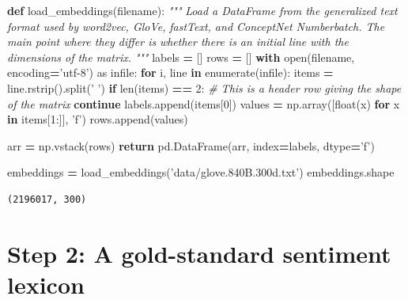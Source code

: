\documentclass[]{book}
\newenvironment{Shaded}{\begin{snugshade}}{\end{snugshade}}
\newcommand{\KeywordTok}[1]{\textcolor[rgb]{0.13,0.29,0.53}{\textbf{#1}}}
\newcommand{\DecValTok}[1]{\textcolor[rgb]{0.00,0.00,0.81}{#1}}
\newcommand{\StringTok}[1]{\textcolor[rgb]{0.31,0.60,0.02}{#1}}
\newcommand{\ImportTok}[1]{#1}
\newcommand{\CommentTok}[1]{\textcolor[rgb]{0.56,0.35,0.01}{\textit{#1}}}
\newcommand{\ControlFlowTok}[1]{\textcolor[rgb]{0.13,0.29,0.53}{\textbf{#1}}}
\newcommand{\OperatorTok}[1]{\textcolor[rgb]{0.81,0.36,0.00}{\textbf{#1}}}
\newcommand{\BuiltInTok}[1]{#1}
\newcommand{\NormalTok}[1]{#1}
\theoremstyle{definition}
\theoremstyle{definition}
\theoremstyle{definition}
\theoremstyle{remark}
\begin{document}
\begin{Shaded}
\begin{Highlighting}[]
\KeywordTok{def}\NormalTok{ load_embeddings(filename):}
    \CommentTok{"""}
\CommentTok{    Load a DataFrame from the generalized text format used by word2vec, GloVe,}
\CommentTok{    fastText, and ConceptNet Numberbatch. The main point where they differ is}
\CommentTok{    whether there is an initial line with the dimensions of the matrix.}
\CommentTok{    """}
\NormalTok{    labels }\OperatorTok{=}\NormalTok{ []}
\NormalTok{    rows }\OperatorTok{=}\NormalTok{ []}
    \ControlFlowTok{with} \BuiltInTok{open}\NormalTok{(filename, encoding}\OperatorTok{=}\StringTok{'utf-8'}\NormalTok{) }\ImportTok{as}\NormalTok{ infile:}
        \ControlFlowTok{for}\NormalTok{ i, line }\KeywordTok{in} \BuiltInTok{enumerate}\NormalTok{(infile):}
\NormalTok{            items }\OperatorTok{=}\NormalTok{ line.rstrip().split(}\StringTok{' '}\NormalTok{)}
            \ControlFlowTok{if} \BuiltInTok{len}\NormalTok{(items) }\OperatorTok{==} \DecValTok{2}\NormalTok{:}
                \CommentTok{# This is a header row giving the shape of the matrix}
                \ControlFlowTok{continue}
\NormalTok{            labels.append(items[}\DecValTok{0}\NormalTok{])}
\NormalTok{            values }\OperatorTok{=}\NormalTok{ np.array([}\BuiltInTok{float}\NormalTok{(x) }\ControlFlowTok{for}\NormalTok{ x }\KeywordTok{in}\NormalTok{ items[}\DecValTok{1}\NormalTok{:]], }\StringTok{'f'}\NormalTok{)}
\NormalTok{            rows.append(values)}
    
\NormalTok{    arr }\OperatorTok{=}\NormalTok{ np.vstack(rows)}
    \ControlFlowTok{return}\NormalTok{ pd.DataFrame(arr, index}\OperatorTok{=}\NormalTok{labels, dtype}\OperatorTok{=}\StringTok{'f'}\NormalTok{)}

\NormalTok{embeddings }\OperatorTok{=}\NormalTok{ load_embeddings(}\StringTok{'data/glove.840B.300d.txt'}\NormalTok{)}
\NormalTok{embeddings.shape}
\end{Highlighting}
\end{Shaded}

\begin{verbatim}
(2196017, 300)
\end{verbatim}

\section{Step 2: A gold-standard sentiment
lexicon}\label{step-2-a-gold-standard-sentiment-lexicon}
\end{document}
